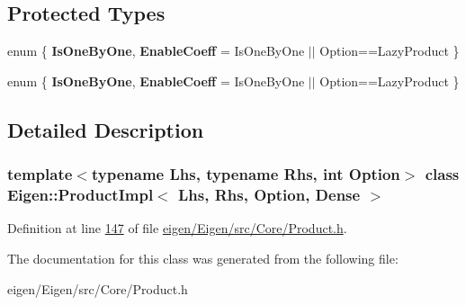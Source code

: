 \subsection*{Protected Types}
\begin{DoxyCompactItemize}
\item 
\mbox{\label{class_eigen_1_1_product_impl_3_01_lhs_00_01_rhs_00_01_option_00_01_dense_01_4_aa7519b803e3a5262f26c08e17e1344a7}} 
enum \{ {\bfseries Is\+One\+By\+One}, 
{\bfseries Enable\+Coeff} = Is\+One\+By\+One $\vert$$\vert$ Option==Lazy\+Product
 \}
\item 
\mbox{\label{class_eigen_1_1_product_impl_3_01_lhs_00_01_rhs_00_01_option_00_01_dense_01_4_a5f6b6f8ddea76f1d9d0bc2c9a0eb3692}} 
enum \{ {\bfseries Is\+One\+By\+One}, 
{\bfseries Enable\+Coeff} = Is\+One\+By\+One $\vert$$\vert$ Option==Lazy\+Product
 \}
\end{DoxyCompactItemize}


\subsection{Detailed Description}
\subsubsection*{template$<$typename Lhs, typename Rhs, int Option$>$\newline
class Eigen\+::\+Product\+Impl$<$ Lhs, Rhs, Option, Dense $>$}



Definition at line \hyperlink{eigen_2_eigen_2src_2_core_2_product_8h_source_l00147}{147} of file \hyperlink{eigen_2_eigen_2src_2_core_2_product_8h_source}{eigen/\+Eigen/src/\+Core/\+Product.\+h}.



The documentation for this class was generated from the following file\+:\begin{DoxyCompactItemize}
\item 
eigen/\+Eigen/src/\+Core/\+Product.\+h\end{DoxyCompactItemize}
